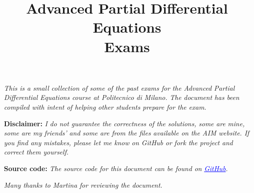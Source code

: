\documentclass[a4paper,12pt]{article}
\begin{document}
\title{\textbf{Advanced Partial Differential Equations \\ Exams}}
\author{}
\date{}
\maketitle

\noindent\textit{This is a small collection of some of the past exams for the Advanced Partial Differential Equations course 
at Politecnico di Milano. The document has been compiled with intent of helping other students prepare for the exam.}

\vspace{0.5cm}

\textbf{Disclaimer:}
\textit{
I do not guarantee the correctness of the solutions, some are mine, some are my friends' and 
some are from the files available on the AIM website. If you find any mistakes, 
please let me know on GitHub or fork the project and correct them yourself.}

\vspace{0.5cm}

\textbf{Source code:}
\textit{
The source code for this document can be found on \href{https://github.com/itsmebonny/APDE_Exams}{\textcolor{blue}{\underline{GitHub}}}.} 
\vspace{0.5cm}

\textit{Many thanks to Martina for reviewing the document.}




\end{document}
